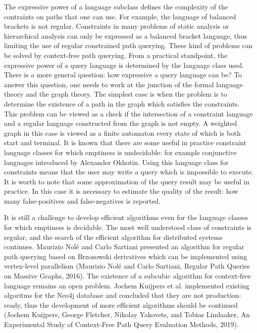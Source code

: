 \documentclass[12pt]{article}  %
\theoremstyle{remark}
\begin{document}
The expressive power of a language subclass defines the complexity of the contraints on paths that one can use.
For example, the language of balanced brackets is not regular.
Constraints in many problems of static analysis or hierarchical analysis can only be expressed as a balanced bracket language, thus limiting the use of regular constrained path querying.
These kind of problems can be solved by context-free path querying.
From a practical standpoint, the expressive power of a query language is determined by the language class used.
There is a more general question: how expressive a query language can be?
To answer this question, one needs to work at the junction of the formal language theory and the graph theory.
The simplest case is when the problem is to determine the existence of a path in the graph which satisfies the constraints.
This problem can be viewed as a check if the intersection of a constraint language and a regular language constructed from the graph is not empty.
A weighted graph in this case is viewed as a finite automaton every state of which is both start and terminal.
It is known that there are some useful in practice constraint language classes for which emptiness is undecidable: for example conjunctive languages introduced by Alexander Okhotin.
Using this language class for constraints means that the user may write a query which is impossible to execute.
It is worth to note that some approximation of the query result may be useful in practice.
In this case it is necessary to estimate the quality of the result: how many false-positives and false-negatives is reported.

It is still a challenge to develop efficient algorithms even for the language classes for which emptiness is decidable.
The most well understood class of constraints is regular, and the search of the efficient algorithm for distributed systems continues.
Maurizio Nolé and Carlo Sartiani presented an algorithm for regular path querying based on Brzozowski derivatives which can be implemented using vertex-level parallelism (Maurizio Nolé and Carlo Sartiani, Regular Path Queries on Massive Graphs, 2016).
The existence of a subcubic algorithm for context-free language remains an open problem.
Jochem Kuijpers et al. implemented existing algoritms for the Neo4j database and concluded that they are not production-ready, thus the development of more efficient algorithms should be continued (Jochem Kuijpers, George Fletcher, Nikolay Yakovets, and Tobias Lindaaker, An Experimental Study of Context-Free Path Query Evaluation Methods,  2019).
\end{document}
